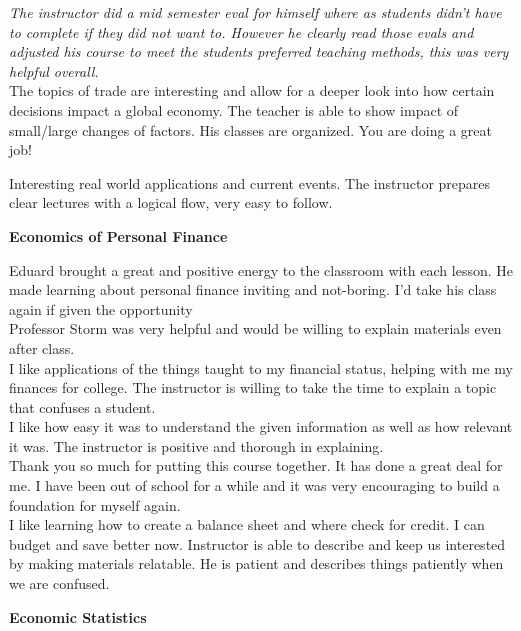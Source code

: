 \documentclass[a4paper,11pt]{article}
\begin{document}
\textit{The instructor did a mid semester eval for himself where as students didn't have to complete if they did not want to. However he clearly read those evals and adjusted his course to meet the students preferred teaching methods, this was very helpful overall.} \\

The topics of trade are interesting and allow for a deeper look into how certain decisions impact a global economy. The teacher is able to show impact of small/large changes of factors. His classes are organized. You are doing a great job!

Interesting real world applications and current events. The instructor prepares clear lectures with a logical flow, very easy to follow. 

\textbf{Economics of Personal Finance}

Eduard brought a great and positive energy to the classroom with each lesson. He made learning about personal finance inviting and not-boring. I'd take his class again if given the opportunity  \\

Professor Storm was very helpful and would be willing to explain materials even after class.  \\

I like applications of the things taught to my financial status, helping with me my finances for college. The instructor is willing to take the time to explain a topic that confuses a student.  \\

I like how easy it was to understand the given information as well as how relevant it was. The instructor is positive and thorough in explaining.  \\

Thank you so much for putting this course together. It has done a great deal for me. I have been out of school for a while and it was very encouraging to build a foundation for myself again.  \\

I like learning how to create a balance sheet and where check for credit. I can budget and save better now. Instructor is able to describe and keep us interested by making materials relatable. He is patient and describes things patiently when we are confused. 

\textbf{Economic Statistics}
\end{document}
